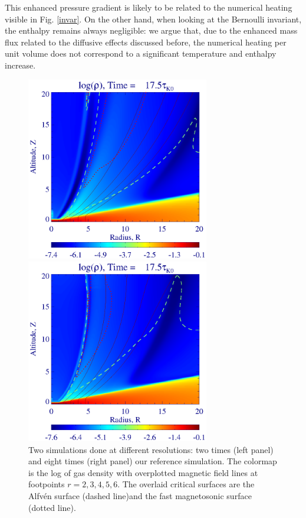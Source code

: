 \documentclass{aa}
\begin{document}
This enhanced pressure gradient is likely to be related to the numerical heating visible
in Fig. \ref{invar}. On the other hand, when looking at the Bernoulli invariant, the enthalpy remains always negligible: we argue that, due to the enhanced mass flux related to the diffusive effects
discussed before, the numerical heating per unit volume does not correspond to a significant temperature and enthalpy increase.


\begin{figure}[t]
\begin{center}
   \begin{minipage}[t]{.48\linewidth}
\includegraphics[width=8cm]{12633c13}
   \end{minipage} \hfill
   \begin{minipage}[t]{.48\linewidth}
\includegraphics[width=8cm]{12633d13}
   \end{minipage} \hfill
\hfill
\caption{ Two simulations done at different resolutions: two times (left panel) and eight times (right panel) our reference simulation. The colormap is the log of gas density with overplotted magnetic
field lines at footpoints $r = 2, 3, 4, 5, 6$. The overlaid critical surfaces are the Alfv\'en surface (dashed line)and the fast magnetosonic surface (dotted line). }
\label{fig:res}
\end{center}
\end{figure}
\end{document}
